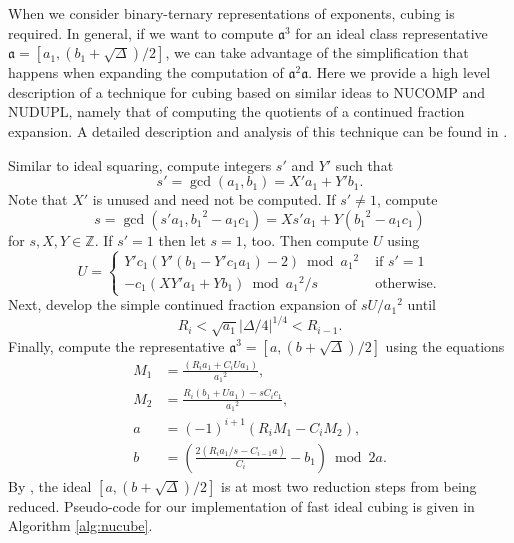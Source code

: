 \documentclass{ucalgthes1}
\theoremstyle{definition}
\newcommand{\ZZ}{\mathbb{Z}}
\begin{document}
When we consider binary-ternary representations of exponents, cubing is required.  In general, if we want to compute ${\mathfrak a}^3$ for an ideal class representative $\mathfrak a = [a_1, (b_1+\sqrt\Delta)/2]$, we can take advantage of the simplification that happens when expanding the computation of ${\mathfrak a}^2 \mathfrak a$.  Here we provide a high level description of a technique for cubing based on similar ideas to NUCOMP and NUDUPL, namely that of computing the quotients of a continued fraction expansion.  A detailed description and analysis of this technique can be found in \cite{Imbert2010}.

Similar to ideal squaring, compute integers $s'$ and $Y'$ such that
\[
s' = \gcd(a_1, b_1) = X'a_1 + Y'b_1.
\]
Note that $X'$ is unused and need not be computed.  If $s' \neq 1$, compute
\[
s = \gcd(s'a_1, {b_1}^2 - a_1c_1) = Xs'a_1 + Y({b_1}^2 - a_1c_1)
\]
for $s, X, Y \in \ZZ$.  If $s' = 1$ then let $s = 1$, too.  Then compute $U$ using
\[
U = \begin{cases}
		Y'c_1(Y'(b_1 - Y'c_1a_1) - 2) \bmod {a_1}^2 & \textrm{ if } s' = 1 \\
		-c_1(XY'a_1+Yb_1) \bmod {a_1}^2/s & \textrm{ otherwise.}
    \end{cases}
\]
Next, develop the simple continued fraction expansion of $sU/{a_1}^2$ until
\[
	R_i < \sqrt{a_1}|\Delta/4|^{1/4} < R_{i-1}.
\]
Finally, compute the representative $\mathfrak a^3 = [a, (b + \sqrt\Delta)/2]$ using the equations
\begin{align*}
	M_1 &= \frac{(R_ia_1 + C_iUa_1)}{{a_1}^2}, \\
	M_2 &= \frac{R_i(b_1 + Ua_1) - sC_ic_1}{{a_1}^2}, \\
	a &= (-1)^{i+1} (R_i M_1 - C_i M_2), \\
	b &= \left( \frac{2(R_ia_1/s - C_{i-1}a)}{C_i} - b_1 \right) \bmod 2a.
\end{align*}
By \cite[p.15~Theorem~5.1]{Imbert2010}, the ideal $[a, (b + \sqrt\Delta)/2]$ is at most two reduction steps from being reduced.  Pseudo-code for our implementation of fast ideal cubing is given in Algorithm \ref{alg:nucube}.
\end{document}
